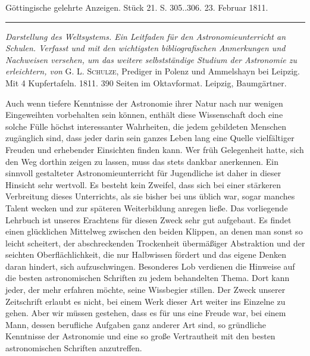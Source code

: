 \begin{center}\small Göttingische gelehrte Anzeigen. Stück 21. S. 305..306. 23. Februar 1811.\\[3pt]\rule{.72\linewidth}{.3pt}\end{center}

\emph{Darstellung des Weltsystems. Ein Leitfaden für den Astronomieunterricht an Schulen. Verfasst und mit den wichtigsten bibliografischen Anmerkungen und Nachweisen versehen, um das weitere selbstständige Studium der Astronomie zu erleichtern, von} G. L. \textsc{Schulze}, Prediger in Polenz und Ammelshayn bei Leipzig. Mit 4 Kupfertafeln. 1811. 390 Seiten im Oktavformat. Leipzig, Baumgärtner.

Auch wenn tiefere Kenntnisse der Astronomie ihrer Natur nach nur wenigen Eingeweihten vorbehalten sein können, enthält diese Wissenschaft doch eine solche Fülle höchst interessanter Wahrheiten, die jedem gebildeten Menschen zugänglich sind, dass jeder darin sein ganzes Leben lang eine Quelle vielfältiger Freuden und erhebender Einsichten finden kann. Wer früh Gelegenheit hatte, sich den Weg dorthin zeigen zu lassen, muss das stets dankbar anerkennen. Ein sinnvoll gestalteter Astronomieunterricht für Jugendliche ist daher in dieser Hinsicht sehr wertvoll. Es besteht kein Zweifel, dass sich bei einer stärkeren Verbreitung dieses Unterrichts, als sie bisher bei uns üblich war, sogar manches Talent wecken und zur späteren Weiterbildung anregen ließe. Das vorliegende Lehrbuch ist unseres Erachtens für diesen Zweck sehr gut aufgebaut. Es findet einen glücklichen Mittelweg zwischen den beiden Klippen, an denen man sonst so leicht scheitert, der abschreckenden Trockenheit übermäßiger Abstraktion und der seichten Oberflächlichkeit, die nur Halbwissen fördert und das eigene Denken daran hindert, sich aufzuschwingen. Besonderes Lob verdienen die Hinweise auf die besten astronomischen Schriften zu jedem behandelten Thema. Dort kann jeder, der mehr erfahren möchte, seine Wissbegier stillen. Der Zweck unserer Zeitschrift erlaubt es nicht, bei einem Werk dieser Art weiter ins Einzelne zu gehen. Aber wir müssen gestehen, dass es für uns eine Freude war, bei einem Mann, dessen berufliche Aufgaben ganz anderer Art sind, so gründliche Kenntnisse der Astronomie und eine so große Vertrautheit mit den besten astronomischen Schriften anzutreffen.
